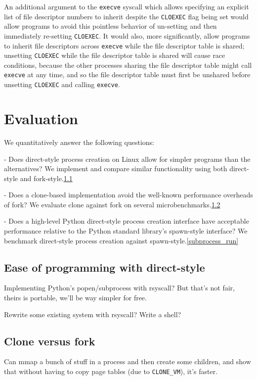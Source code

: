 \documentclass[sigplan]{acmart}
\begin{document}
An additional argument to the \texttt{execve} syscall
which allows specifying an explicit list of file descriptor numbers to inherit despite the \texttt{CLOEXEC} flag being set
would allow programs to avoid this pointless behavior of un-setting and then immediately re-setting \texttt{CLOEXEC}.
It would also, more significantly, allow programs to inherit file descriptors across \texttt{execve}
while the file descriptor table is shared;
unsetting \texttt{CLOEXEC} while the file descriptor table is shared will cause race conditions,
because the other processes sharing the file descriptor table might call \texttt{execve} at any time,
and so the file descriptor table must first be unshared before unsetting \texttt{CLOEXEC} and calling \texttt{execve}.
\section{Evaluation}\label{evaluation}
    We quantitatively answer the following questions:

    - Does direct-style process creation on Linux allow for simpler programs than the alternatives?
      We implement and compare similar functionality using both direct-style and fork-style.\ref{ease}

    - Does a clone-based implementation avoid the well-known performance overheads of fork?
      We evaluate clone against fork on several microbenchmarks.\ref{microbench}

    - Does a high-level Python direct-style process creation interface
      have acceptable performance relative to the Python standard library's spawn-style interface?
      We benchmark direct-style process creation against spawn-style.\ref{subprocess_run}
\subsection{Ease of programming with direct-style}\label{ease}
Implementing Python's popen/subprocess with rsyscall?
But that's not fair, theirs is portable, we'll be way simpler for free.

Rewrite some existing system with rsyscall?
Write a shell?
\subsection{Clone versus fork}\label{microbench}
Can mmap a bunch of stuff in a process and then create some children,
and show that without having to copy page tables (due to \verb|CLONE_VM|), it's faster.
\end{document}
